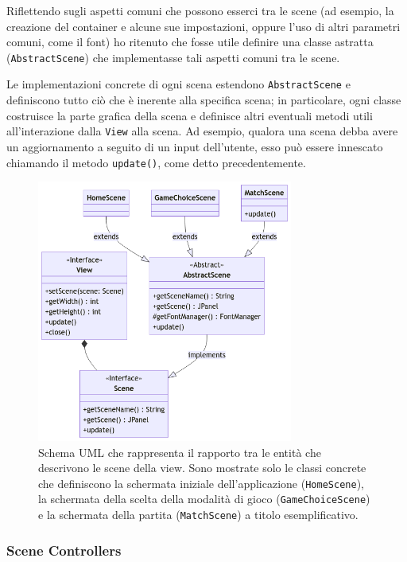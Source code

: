 \documentclass[a4paper,12pt]{report}
\begin{document}
Riflettendo sugli aspetti comuni che possono esserci tra le scene (ad esempio, la creazione del container e alcune sue impostazioni, oppure l'uso di altri parametri comuni, come il font) ho ritenuto che fosse utile definire una classe astratta (\texttt{AbstractScene}) che implementasse tali aspetti comuni tra le scene. 

Le implementazioni concrete di ogni scena estendono \texttt{AbstractScene} e definiscono tutto ciò che è inerente alla specifica scena; in particolare, ogni classe costruisce la parte grafica della scena e definisce altri eventuali metodi utili all'interazione dalla \texttt{View} alla scena. Ad esempio, qualora una scena debba avere un aggiornamento a seguito di un input dell'utente, esso può essere innescato chiamando il metodo \texttt{update()}, come detto precedentemente.

\begin{figure}[H]
\centering
\includegraphics[width=0.75\textwidth]{images/scenes.png}
\caption{Schema UML che rappresenta il rapporto tra le entità che descrivono le scene della view. Sono mostrate solo le classi concrete che definiscono la schermata iniziale dell'applicazione (\texttt{HomeScene}), la schermata della scelta della modalità di gioco (\texttt{GameChoiceScene}) e la schermata della partita (\texttt{MatchScene}) a titolo esemplificativo.}
\label{images:scenes}
\end{figure}

\subsubsection{Scene Controllers}
\end{document}
